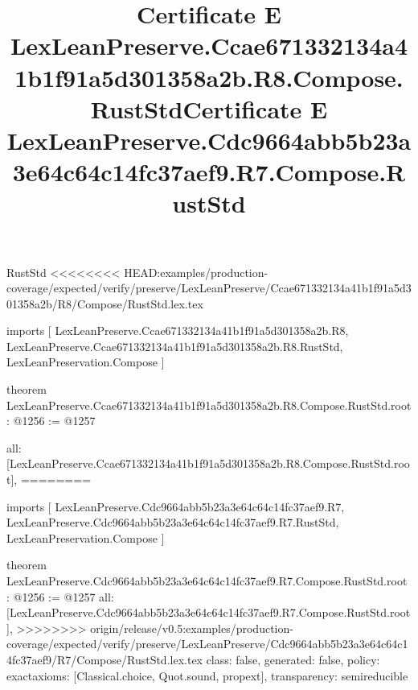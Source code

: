 \begin{lexlean}{RustStd}
<<<<<<<< HEAD:examples/production-coverage/expected/verify/preserve/LexLeanPreserve/Ccae671332134a41b1f91a5d301358a2b/R8/Compose/RustStd.lex.tex
\title{Certificate E LexLeanPreserve.Ccae671332134a41b1f91a5d301358a2b.R8.Compose.RustStd}
\begin{coremodule}
imports [
  LexLeanPreserve.Ccae671332134a41b1f91a5d301358a2b.R8,
  LexLeanPreserve.Ccae671332134a41b1f91a5d301358a2b.R8.RustStd,
  LexLeanPreservation.Compose
]

theorem LexLeanPreserve.Ccae671332134a41b1f91a5d301358a2b.R8.Compose.RustStd.root : @1256 := @1257 {
  all: [LexLeanPreserve.Ccae671332134a41b1f91a5d301358a2b.R8.Compose.RustStd.root],
========
\title{Certificate E LexLeanPreserve.Cdc9664abb5b23a3e64c64c14fc37aef9.R7.Compose.RustStd}
\begin{coremodule}
imports [
  LexLeanPreserve.Cdc9664abb5b23a3e64c64c14fc37aef9.R7,
  LexLeanPreserve.Cdc9664abb5b23a3e64c64c14fc37aef9.R7.RustStd,
  LexLeanPreservation.Compose
]

theorem LexLeanPreserve.Cdc9664abb5b23a3e64c64c14fc37aef9.R7.Compose.RustStd.root : @1256 := @1257 {
  all: [LexLeanPreserve.Cdc9664abb5b23a3e64c64c14fc37aef9.R7.Compose.RustStd.root],
>>>>>>>> origin/release/v0.5:examples/production-coverage/expected/verify/preserve/LexLeanPreserve/Cdc9664abb5b23a3e64c64c14fc37aef9/R7/Compose/RustStd.lex.tex
  class: false,
  generated: false,
  policy: exact{axioms: [Classical.choice, Quot.sound, propext]},
  transparency: semireducible
}


\end{coremodule}}
\end{coremodule}
\end{lexlean}
